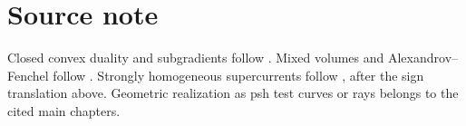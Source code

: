 \section*{Source note}
\label{sec:appD-source-note}

Closed convex duality and subgradients follow
\cite[Chapters~7, 12, and~23--25]{Roc70}.
Mixed volumes and Alexandrov--Fenchel follow \cite{Sch14}.
Strongly homogeneous supercurrents follow \cite{Ber26Convex}, after the sign
translation above.
Geometric realization as psh test curves or rays belongs to the cited main
chapters.
